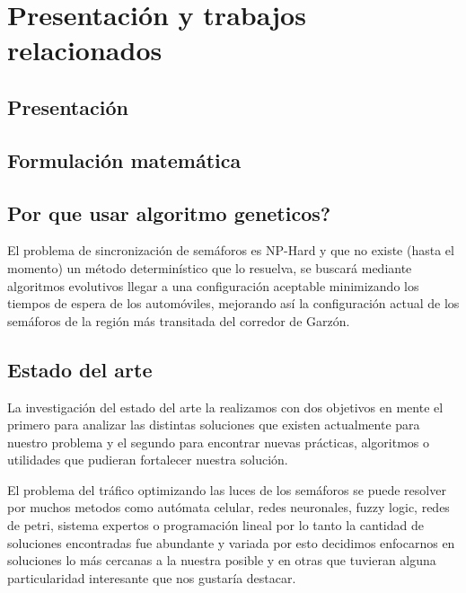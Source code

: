 \chapter{Presentación y trabajos relacionados}

\section{Presentación}
\section{Formulación matemática}

\section{Por que usar algoritmo geneticos?}
El problema de sincronización de semáforos es NP-Hard y que
no existe (hasta el momento) un método determinístico que lo
resuelva, se buscará mediante algoritmos evolutivos llegar a
una configuración aceptable minimizando los tiempos de
espera de los automóviles, mejorando así la configuración
actual de los semáforos de la región más transitada del corredor
de Garzón.

\section{Estado del arte}
La investigación del estado del arte la realizamos con dos objetivos en mente el primero para analizar las distintas soluciones que existen actualmente para nuestro problema y el segundo para encontrar nuevas prácticas, algoritmos o utilidades que pudieran fortalecer nuestra solución.

El problema del tráfico optimizando las luces de los semáforos se puede resolver por muchos metodos como autómata celular, redes neuronales, fuzzy logic, redes de petri, sistema expertos o programación lineal por lo tanto la cantidad de soluciones encontradas fue abundante y variada por esto decidimos enfocarnos en soluciones lo más cercanas a la nuestra posible y en otras que tuvieran alguna particularidad interesante que nos gustaría destacar.


